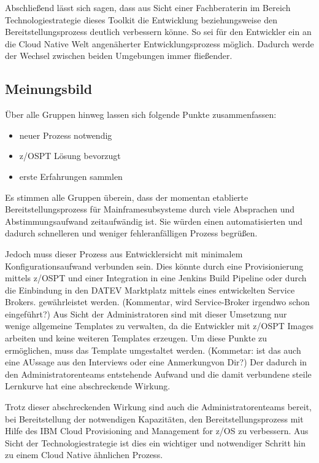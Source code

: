 Abschließend lässt sich sagen, dass aus Sicht einer Fachberaterin im Bereich Technologiestrategie dieses Toolkit die Entwicklung beziehungsweise den Bereitstellungsprozess deutlich verbessern könne.
So sei für den Entwickler ein an die Cloud Native Welt angenäherter Entwicklungsprozess möglich.
Dadurch werde der Wechsel zwischen beiden Umgebungen immer fließender.

\subsection{Meinungsbild}
Über alle Gruppen hinweg lassen sich folgende Punkte zusammenfassen:

\begin{itemize}
\item neuer Prozess notwendig
\item z/OSPT Lösung bevorzugt
\item erste Erfahrungen sammlen
\end{itemize}

Es stimmen alle Gruppen überein, dass der momentan etablierte Bereitstellungsprozess für Mainframesubsysteme durch viele Absprachen und Abstimmungsaufwand zeitaufwändig ist.
Sie würden einen automatisierten und dadurch schnelleren und weniger fehleranfälligen Prozess begrüßen.

Jedoch muss dieser Prozess aus Entwicklersicht mit minimalem Konfigurationsaufwand verbunden sein.
Dies könnte durch eine Provisionierung mittels z/OSPT und einer  Integration in eine Jenkins Build Pipeline oder durch die Einbindung in den \glqq DATEV Marktplatz\grqq{} mittels eines entwickelten \glqq Service Brokers\grqq. gewährleistet werden. (Kommentar, wird Service-Broker irgendwo schon eingeführt?)
Aus Sicht der Administratoren sind mit dieser Umsetzung nur wenige allgemeine Templates zu verwalten, da die Entwickler mit z/OSPT Images arbeiten und keine weiteren Templates erzeugen.
Um diese Punkte zu ermöglichen, muss das Template umgestaltet werden. (Kommetar: ist das auch eine AUssage aus den Interviews oder eine Anmerkungvon Dir?)
Der dadurch in den Administratorenteams entstehende Aufwand und die damit verbundene steile Lernkurve hat eine abschreckende Wirkung.

Trotz dieser abschreckenden Wirkung sind auch die Administratorenteams bereit, bei Bereitstellung der notwendigen Kapazitäten, den Bereitstellungsprozess mit Hilfe des \glqq IBM Cloud Provisioning and Management for z/OS\grqq{} zu verbessern.
Aus Sicht der Technologiestrategie ist dies ein wichtiger und notwendiger Schritt hin zu einem Cloud Native ähnlichen Prozess.
